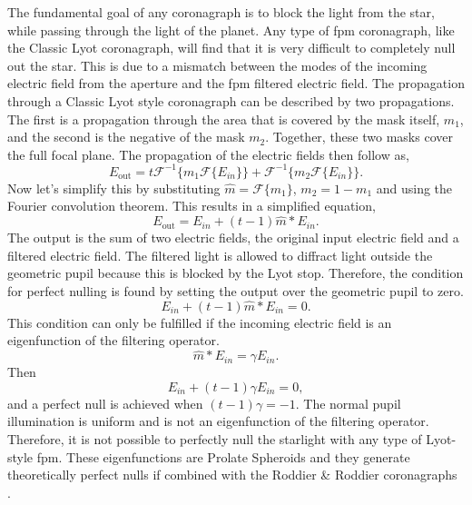 \documentclass[letterpaper]{ar-1col}
\newcommand{\fourier}[1]{\mathcal{F}\{#1\}}
\newcommand{\invfourier}[1]{\mathcal{F}^{-1}\{#1\}}
\begin{document}
The fundamental goal of any coronagraph is to block the light from the star, while passing through the light of the planet.
%
Any type of \ac{fpm} coronagraph, like the Classic Lyot coronagraph, will find that it is very difficult to completely null out the star.
%
This is due to a mismatch between the modes of the incoming electric field from the aperture and the \ac{fpm} filtered electric field.
%
The propagation through a Classic Lyot style coronagraph can be described by two propagations.
%
The first is a propagation through the area that is covered by the mask itself, $m_1$, and the second is the negative of the mask $m_2$.
%
Together, these two masks cover the full focal plane.
%
The propagation of the electric fields then follow as,
\begin{equation}
    E_{\mathrm{out}} = t\invfourier{m_1 \fourier{E_{in}}} + \invfourier{m_2 \fourier{E_{in}}}.
\end{equation}
Now let's simplify this by substituting $\hat{m}=\fourier{m_1}$, $m_2 = 1 - m_1$ and using the Fourier convolution theorem. This results in a simplified equation,
\begin{equation}
    E_{\mathrm{out}} = E_{in} + (t-1)\hat{m}*E_{in}.
\end{equation}
The output is the sum of two electric fields, the original input electric field and a filtered electric field.
%
The filtered light is allowed to diffract light outside the geometric pupil because this is blocked by the Lyot stop.
%
Therefore, the condition for perfect nulling is found by setting the output over the geometric pupil to zero. 
\begin{equation}
    E_{in} + (t-1)\hat{m}*E_{in} = 0.
\end{equation}
This condition can only be fulfilled if the incoming electric field is an eigenfunction of the filtering operator.
\begin{equation}
    \hat{m}*E_{in} = \gamma E_{in}.
\end{equation}
Then
\begin{equation}
    E_{in} + (t-1)\gamma E_{in} = 0,
\end{equation}
and a perfect null is achieved when $(t-1)\gamma = -1$.
%
The normal pupil illumination is uniform and is not an eigenfunction of the filtering operator.
%
Therefore, it is not possible to perfectly null the starlight with any type of Lyot-style \ac{fpm}.
%
These eigenfunctions are Prolate Spheroids and they generate theoretically perfect nulls if combined with the Roddier \& Roddier coronagraphs \citep{soummer2003stellar}.
\end{document}
